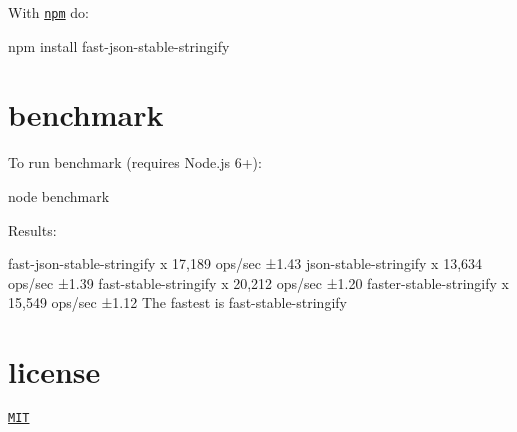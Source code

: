 With \href{https://npmjs.org}{\tt npm} do\+:


\begin{DoxyCode}
npm install fast-json-stable-stringify
\end{DoxyCode}


\section*{benchmark}

To run benchmark (requires Node.\+js 6+)\+: 
\begin{DoxyCode}
node benchmark
\end{DoxyCode}


Results\+: 
\begin{DoxyCode}
fast-json-stable-stringify x 17,189 ops/sec ±1.43%
json-stable-stringify x 13,634 ops/sec ±1.39%
fast-stable-stringify x 20,212 ops/sec ±1.20%
faster-stable-stringify x 15,549 ops/sec ±1.12%
The fastest is fast-stable-stringify
\end{DoxyCode}


\section*{license}

\href{https://github.com/epoberezkin/fast-json-stable-stringify/blob/master/LICENSE}{\tt M\+IT} 